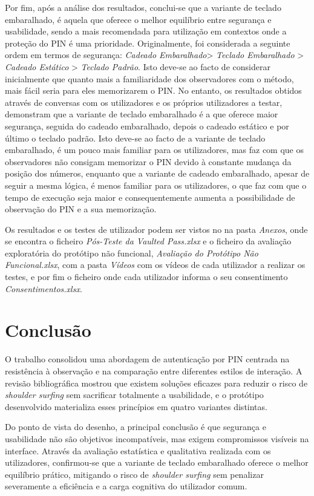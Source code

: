 \documentclass[a4paper]{article}
\begin{document}
Por fim, após a análise dos resultados, conclui-se que a variante de teclado embaralhado, é aquela que 
oferece o melhor equilíbrio entre segurança e usabilidade, sendo a mais recomendada para utilização em 
contextos onde a proteção do PIN é uma prioridade. 
\newpage
Originalmente, foi considerada a seguinte ordem 
em termos de segurança: \textit{Cadeado Embaralhado}> \textit{Teclado Embaralhado}  > \textit{Cadeado Estático} 
> \textit{Teclado Padrão}. Isto deve-se ao facto de considerar inicialmente que quanto mais a familiaridade 
dos observadores com o método, mais fácil seria para eles memorizarem o PIN. No entanto, os resultados obtidos 
através de conversas com os utilizadores e os próprios utilizadores a testar, demonstram que a variante de teclado embaralhado é a que oferece maior segurança,
seguida do cadeado embaralhado, depois o cadeado estático e por último o teclado padrão. Isto deve-se ao facto de a 
variante de teclado embaralhado, é um pouco mais familiar para os utilizadores, mas faz com que os observadores não consigam 
memorizar o PIN devido à constante mudança da posição dos números, enquanto que a variante de cadeado embaralhado, 
apesar de seguir a mesma lógica, é menos familiar para os utilizadores, o que faz com que o tempo de execução seja 
maior e consequentemente aumenta a possibilidade de observação do PIN e a sua memorização. 

Os resultados e os testes de utilizador podem ser vistos no na pasta \textit{Anexos}, onde se 
encontra o ficheiro \textit{Pós-Teste da Vaulted Pass.xlsx} e o ficheiro da avaliação exploratória do 
protótipo não funcional, \textit{Avaliação do Protótipo Não Funcional.xlsx}, com a pasta \textit{Vídeos} com os vídeos de 
cada utilizador a realizar os testes, e por fim o ficheiro onde cada utilizador informa o seu consentimento \textit{Consentimentos.xlsx}.

\newpage
\section{Conclusão}\label{conclusao}
O trabalho consolidou uma abordagem de autenticação por PIN centrada na resistência à observação e na comparação entre diferentes estilos 
de interação. A revisão bibliográfica mostrou que existem soluções eficazes para reduzir o risco de \textit{shoulder surfing} sem sacrificar 
totalmente a usabilidade, e o protótipo desenvolvido materializa esses princípios em quatro variantes distintas.


Do ponto de vista do desenho, a principal conclusão é que segurança e usabilidade não são objetivos incompatíveis, 
mas exigem compromissos visíveis na interface. Através da avaliação estatística e qualitativa realizada com os 
utilizadores, confirmou-se que a variante de teclado embaralhado oferece o melhor equilíbrio prático, 
mitigando o risco de \textit{shoulder surfing} sem penalizar severamente a eficiência e a carga cognitiva do utilizador comum.

\nocite{roth2004pin,rotary2009}
\newpage
\vspace{2cm}
\renewcommand{\refname}{Bibliografia}
\renewcommand{\bibname}{Bibliografia}
\printbibliography
\end{document}
